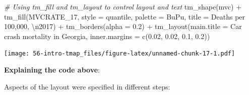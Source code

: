 \documentclass[
]{book}
\newenvironment{Shaded}{\begin{snugshade}}{\end{snugshade}}
\newcommand{\AttributeTok}[1]{\textcolor[rgb]{0.77,0.63,0.00}{#1}}
\newcommand{\CommentTok}[1]{\textcolor[rgb]{0.56,0.35,0.01}{\textit{#1}}}
\newcommand{\FloatTok}[1]{\textcolor[rgb]{0.00,0.00,0.81}{#1}}
\newcommand{\FunctionTok}[1]{\textcolor[rgb]{0.00,0.00,0.00}{#1}}
\newcommand{\NormalTok}[1]{#1}
\newcommand{\SpecialCharTok}[1]{\textcolor[rgb]{0.00,0.00,0.00}{#1}}
\newcommand{\StringTok}[1]{\textcolor[rgb]{0.31,0.60,0.02}{#1}}
\begin{document}
\begin{Shaded}
\begin{Highlighting}[]
\CommentTok{\# Using tm\_fill and tm\_layout to control layout and text}
\FunctionTok{tm\_shape}\NormalTok{(mvc) }\SpecialCharTok{+}
  \FunctionTok{tm\_fill}\NormalTok{(}\StringTok{\textquotesingle{}MVCRATE\_17\textquotesingle{}}\NormalTok{,}
          \AttributeTok{style =} \StringTok{\textquotesingle{}quantile\textquotesingle{}}\NormalTok{,}
          \AttributeTok{palette =} \StringTok{\textquotesingle{}BuPu\textquotesingle{}}\NormalTok{,}
          \AttributeTok{title =} \StringTok{\textquotesingle{}Deaths per 100,000, }\SpecialCharTok{\textbackslash{}n}\StringTok{2017\textquotesingle{}}\NormalTok{) }\SpecialCharTok{+}
  \FunctionTok{tm\_borders}\NormalTok{(}\AttributeTok{alpha =} \FloatTok{0.2}\NormalTok{) }\SpecialCharTok{+}
  \FunctionTok{tm\_layout}\NormalTok{(}\AttributeTok{main.title =} \StringTok{\textquotesingle{}Car crash mortality in Georgia\textquotesingle{}}\NormalTok{,}
            \AttributeTok{inner.margins =} \FunctionTok{c}\NormalTok{(}\FloatTok{0.02}\NormalTok{, }\FloatTok{0.02}\NormalTok{, }\FloatTok{0.1}\NormalTok{, }\FloatTok{0.2}\NormalTok{))}
\end{Highlighting}
\end{Shaded}

\texttt{[image: 56-intro-tmap\_files/figure-latex/unnamed-chunk-17-1.pdf]}

\textbf{Explaining the code above}:

Aspects of the layout were specified in different steps:
\end{document}
